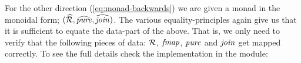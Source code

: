 %
For the other direction (\ref{eq:monad-backwards}) we are given a
monad in the monoidal form; $(\EndoR, \pureNT, \joinNT)$. The various
equality-principles again give us that it is sufficient to equate the
data-part of the above. That is, we only need to verify that the
following pieces of data: $\mathcal{R}$, $\fmap$, $\pure$ and $\join$ get
mapped correctly. To see the full details check the implementation in
the module:
%
\begin{center}
\end{center}
